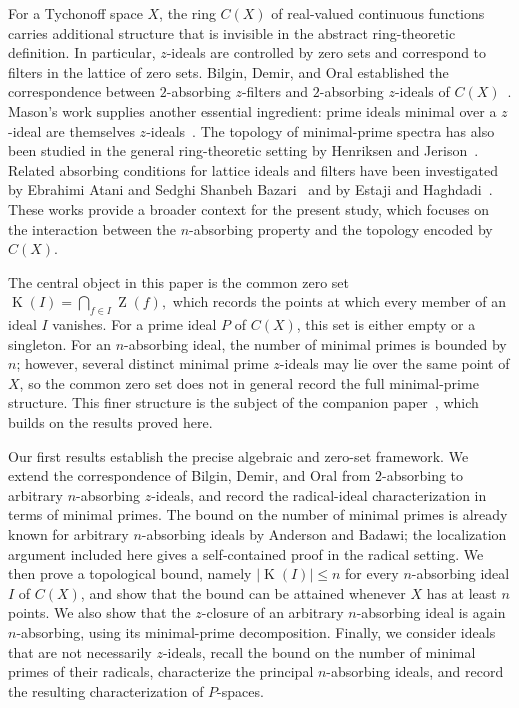 \documentclass[11pt]{amsart}
\theoremstyle{definition}
\theoremstyle{remark}
\DeclareMathOperator{\Z}{Z}
\DeclareMathOperator{\K}{K}
\begin{document}
For a Tychonoff space $X$, the ring $C(X)$ of real-valued continuous
functions carries additional structure that is invisible in the
abstract ring-theoretic definition. In particular, $z$-ideals are
controlled by zero sets and correspond to filters in the lattice of
zero sets. Bilgin, Demir, and Oral established the correspondence
between $2$-absorbing $z$-filters and $2$-absorbing $z$-ideals of
$C(X)$~\cite{BilginDemirOral}. Mason's work supplies another essential
ingredient: prime ideals minimal over a $z$-ideal are themselves
$z$-ideals~\cite[Theorem~1.1]{Mason}. The topology of minimal-prime
spectra has also been studied in the general ring-theoretic setting
by Henriksen and Jerison~\cite{HenriksenJerison}. Related absorbing
conditions for lattice ideals and filters have been investigated by
Ebrahimi Atani and Sedghi Shanbeh Bazari~\cite{EbrahimiAtaniSedghi}
and by Estaji and Haghdadi~\cite{EstajiHaghdadi}. These works provide
a broader context for the present study, which focuses on the
interaction between the $n$-absorbing property and the topology
encoded by $C(X)$.

The central object in this paper is the common zero set
$
  \K(I)=\bigcap_{f\in I}\Z(f),
$
which records the points at which every member of an ideal $I$ vanishes.
For a prime ideal $P$ of $C(X)$, this set is either empty or a singleton.
For an $n$-absorbing ideal, the number of minimal primes is bounded by
$n$; however, several distinct minimal prime $z$-ideals may lie over
the same point of $X$, so the common zero set does not in general
record the full minimal-prime structure. This finer structure is the
subject of the companion paper~\cite{EstajiB}, which builds on the
results proved here.

Our first results establish the precise algebraic and zero-set
framework. We extend the correspondence of Bilgin, Demir, and Oral from
$2$-absorbing to arbitrary $n$-absorbing $z$-ideals, and record the
radical-ideal characterization in terms of minimal primes. The bound
on the number of minimal primes is already known for arbitrary
$n$-absorbing ideals by Anderson and Badawi; the localization argument
included here gives a self-contained proof in the radical setting.
We then prove a topological bound, namely
$|\K(I)|\leq n$ for every $n$-absorbing ideal $I$ of $C(X)$, and show
that the bound can be attained whenever $X$ has at least $n$ points.
We also show that the $z$-closure of an arbitrary $n$-absorbing ideal
is again $n$-absorbing, using its minimal-prime decomposition.
Finally, we consider ideals that are not necessarily $z$-ideals,
recall the bound on the number of minimal primes of their radicals,
characterize the principal $n$-absorbing ideals, and record the
resulting characterization of $P$-spaces.
\end{document}
